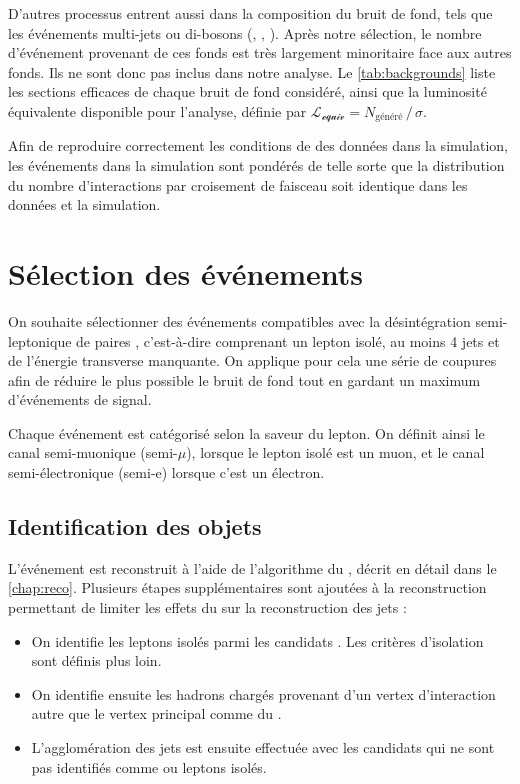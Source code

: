 D'autres processus entrent aussi dans la composition du bruit de fond, tels que les événements multi-jets ou di-bosons (\PW{}\PW, \PZ{}\PZ, \PW{}\PZ). Après notre sélection, le nombre d'événement provenant de ces fonds est très largement minoritaire face aux autres fonds. Ils ne sont donc pas inclus dans notre analyse. Le \cref{tab:backgrounds} liste les sections efficaces de chaque bruit de fond considéré, ainsi que la luminosité équivalente disponible pour l'analyse, définie par $\mathcal{L_\text{equiv}} = N_\text{généré} \, / \, \sigma$.

Afin de reproduire correctement les conditions de \pu des données dans la simulation, les événements dans la simulation sont pondérés de telle sorte que la distribution du nombre d'interactions par croisement de faisceau soit identique dans les données et la simulation.

\section{Sélection des événements}

On souhaite sélectionner des événements compatibles avec la désintégration semi-leptonique de paires \ttbar, c'est-à-dire comprenant un lepton isolé, au moins 4 jets et de l'énergie transverse manquante. On applique pour cela une série de coupures afin de réduire le plus possible le bruit de fond tout en gardant un maximum d'événements de signal.

\medskip

Chaque événement est catégorisé selon la saveur du lepton. On définit ainsi le canal semi-muonique (semi-$\mu$), lorsque le lepton isolé est un muon, et le canal semi-électronique (semi-e) lorsque c'est un électron.

\subsection{Identification des objets}


L'événement est reconstruit à l'aide de l'algorithme du \pf, décrit en détail dans le \cref{chap:reco}. Plusieurs étapes supplémentaires sont ajoutées à la reconstruction permettant de limiter les effets du \pu sur la reconstruction des jets :
\begin{itemize}
    \item On identifie les leptons isolés parmi les candidats \pf. Les critères d'isolation sont définis plus loin.
    \item On identifie ensuite les hadrons chargés provenant d'un vertex d'interaction autre que le vertex principal comme du \pu.
    \item L'agglomération des jets est ensuite effectuée avec les candidats \pf qui ne sont pas identifiés comme \pu ou leptons isolés.
\end{itemize}

